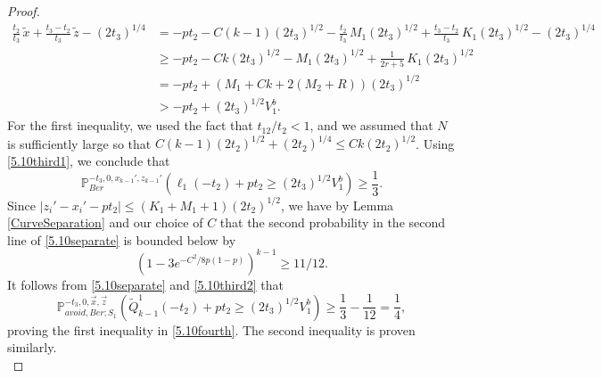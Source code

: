\begin{proof}
\begin{align*}
	\frac{t_2}{t_3}\,\tilde{x} + \frac{t_3-t_2}{t_3}\,\tilde{z} - (2t_3)^{1/4} &= -pt_2 - C(k-1)(2t_3)^{1/2} - \frac{t_2}{t_3}\,M_1(2t_3)^{1/2} + \frac{t_3-t_2}{t_3}\,K_1(2t_3)^{1/2} - (2t_3)^{1/4}\\ 
	&\geq -pt_2 - Ck(2t_3)^{1/2} - M_1(2t_3)^{1/2} + \frac{1}{2r+5}\,K_1(2t_3)^{1/2}\\
	&= -pt_2 + (M_1 + Ck + 2(M_2+R))(2t_3)^{1/2}\\
	&> -pt_2 + (2t_3)^{1/2}V_1^b.
	\end{align*}
	For the first inequality, we used the fact that $t_{12}/t_2 < 1$, and we assumed that $N$ is sufficiently large so that $C(k-1)(2t_2)^{1/2} + (2t_2)^{1/4} \leq Ck(2t_2)^{1/2}$. Using \eqref{5.10third1}, we conclude that
	\begin{equation}\label{5.10third2}
	\mathbb{P}^{-t_3,0,x_{k-1}',z_{k-1}'}_{Ber}\left(\ell_1(-t_2) + pt_2 \geq (2t_3)^{1/2}V_1^b\right) \geq \frac{1}{3}.
	\end{equation}
	Since $|z_i'-x_i'-pt_2| \leq (K_1+M_1+1)(2t_2)^{1/2}$, we have by Lemma \ref{CurveSeparation} and our choice of $C$ that the second probability in the second line of \eqref{5.10separate} is bounded below by
	\[
	\left(1-3e^{-C^2/8p(1-p)}\right)^{k-1} \geq 11/12.
	\]
	It follows from \eqref{5.10separate} and \eqref{5.10third2} that
	\begin{equation*}
	\mathbb{P}^{-t_3,0,\vec{x},\vec{z}}_{avoid,Ber;S_1}\left(\tilde{Q}^1_{k-1}(-t_2) + pt_2 \geq (2t_3)^{1/2}V_1^b\right) \geq \frac{1}{3} - \frac{1}{12} = \frac{1}{4},
	\end{equation*}
	proving the first inequality in \eqref{5.10fourth}. The second inequality is proven similarly.
	\\
	

\end{proof}
